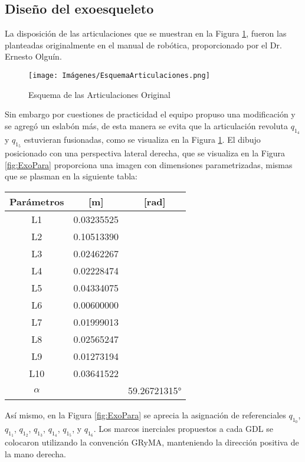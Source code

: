 \documentclass[journal, trans, spanish]{IEEEtran}
\begin{document}
\subsection{Diseño del exoesqueleto}
\noindent La disposición de las articulaciones que se muestran en la Figura \ref{fig:EsqArtOri}, fueron las planteadas originalmente en el manual de robótica, proporcionado por el Dr. Ernesto Olguín.

\begin{figure} [H]
         \centering
         \texttt{[image: Imágenes/EsquemaArticulaciones.png]} 
     \caption{Esquema de las Articulaciones Original}
     \label{fig:EsqArtOri}
\end{figure}
 \noindent Sin embargo por cuestiones de practicidad el equipo propuso una modificación y se agregó un eslabón más, de esta manera se evita que la articulación revoluta  $q_1_4$ y  $q_1_5$ estuvieran fusionadas, como se visualiza en la Figura \ref{fig:EsqArtOri}. El dibujo posicionado con una perspectiva lateral derecha, que se visualiza en la Figura \ref{fig:ExoPara} proporciona una imagen con dimensiones parametrizadas, mismas que se plasman en la siguiente tabla: 

\begin{table}[!ht] %
\centering
\begin{center}
\begin{tabular}{ccc}
Parámetros & [m] & [rad] \\
\hline \hline 
L1 & 0.03235525 & \\ 
L2 & 0.10513390 & \\
L3 & 0.02462267 & \\
L4 & 0.02228474 & \\
L5 & 0.04334075 & \\
L6 & 0.00600000 & \\
L7 & 0.01999013 & \\
L8 & 0.02565247 & \\
L9 & 0.01273194 & \\
L10 & 0.03641522 & \\
$\alpha$ &  & 59.26721315°\\
\end{tabular}
\end{center}
\end{table}
Así mismo, en la Figura \ref{fig:ExoPara} se aprecia la asignación de referenciales $q_1_0$, $q_1_1$, $q_1_2$, $q_1_3$, $q_1_4$, $q_1_5$, y $q_1_6$. Los marcos inerciales propuestos a cada GDL se colocaron utilizando la convención GRyMA, manteniendo la dirección positiva de la mano derecha.
\end{document}
